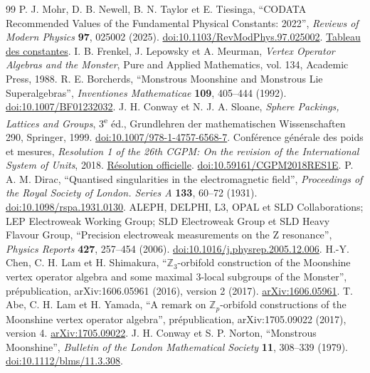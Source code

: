 \begin{thebibliography}{99}
 P. J. Mohr, D. B. Newell, B. N. Taylor et E. Tiesinga, ``CODATA Recommended Values of the Fundamental Physical Constants: 2022'', \emph{Reviews of Modern Physics} \textbf{97}, 025002 (2025). \href{https://doi.org/10.1103/RevModPhys.97.025002}{doi:10.1103/RevModPhys.97.025002}. \href{https://physics.nist.gov/cuu/Constants/Table/allascii.txt}{Tableau des constantes}.
 I. B. Frenkel, J. Lepowsky et A. Meurman, \emph{Vertex Operator Algebras and the Monster}, Pure and Applied Mathematics, vol. 134, Academic Press, 1988.
 R. E. Borcherds, ``Monstrous Moonshine and Monstrous Lie Superalgebras'', \emph{Inventiones Mathematicae} \textbf{109}, 405--444 (1992). \href{https://doi.org/10.1007/BF01232032}{doi:10.1007/BF01232032}.
 J. H. Conway et N. J. A. Sloane, \emph{Sphere Packings, Lattices and Groups}, 3\textsuperscript{e} éd., Grundlehren der mathematischen Wissenschaften 290, Springer, 1999. \href{https://doi.org/10.1007/978-1-4757-6568-7}{doi:10.1007/978-1-4757-6568-7}.
 Conférence générale des poids et mesures, \emph{Resolution 1 of the 26th CGPM: On the revision of the International System of Units}, 2018. \href{https://www.bipm.org/en/committees/cg/cgpm/26-2018/resolution-1}{Résolution officielle}. \href{https://doi.org/10.59161/CGPM2018RES1E}{doi:10.59161/CGPM2018RES1E}.
 P. A. M. Dirac, ``Quantised singularities in the electromagnetic field'', \emph{Proceedings of the Royal Society of London. Series A} \textbf{133}, 60--72 (1931). \href{https://doi.org/10.1098/rspa.1931.0130}{doi:10.1098/rspa.1931.0130}.
 ALEPH, DELPHI, L3, OPAL et SLD Collaborations; LEP Electroweak Working Group; SLD Electroweak Group et SLD Heavy Flavour Group, ``Precision electroweak measurements on the Z resonance'', \emph{Physics Reports} \textbf{427}, 257--454 (2006). \href{https://doi.org/10.1016/j.physrep.2005.12.006}{doi:10.1016/j.physrep.2005.12.006}.
 H.-Y. Chen, C. H. Lam et H. Shimakura, ``\(\mathbb Z_3\)-orbifold construction of the Moonshine vertex operator algebra and some maximal \(3\)-local subgroups of the Monster'', prépublication, arXiv:1606.05961 (2016), version 2 (2017). \href{https://arxiv.org/abs/1606.05961}{arXiv:1606.05961}.
 T. Abe, C. H. Lam et H. Yamada, ``A remark on \(\mathbb Z_p\)-orbifold constructions of the Moonshine vertex operator algebra'', prépublication, arXiv:1705.09022 (2017), version 4. \href{https://arxiv.org/abs/1705.09022v4}{arXiv:1705.09022}.
 J. H. Conway et S. P. Norton, ``Monstrous Moonshine'', \emph{Bulletin of the London Mathematical Society} \textbf{11}, 308--339 (1979). \href{https://doi.org/10.1112/blms/11.3.308}{doi:10.1112/blms/11.3.308}.

\end{thebibliography}
